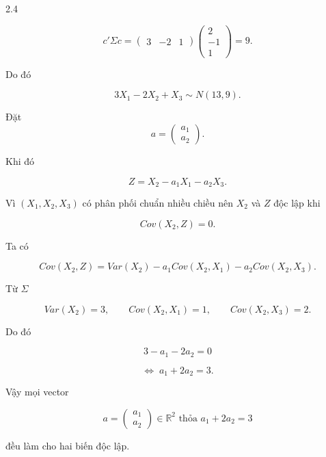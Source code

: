 \begin{question}{2.4}
\begin{subquestion}
\begin{answer}
\[
c'\Sigma c=
\begin{pmatrix}
3&-2&1
\end{pmatrix}
\begin{pmatrix}
2\\
-1\\
1
\end{pmatrix}
=9.
\]

Do đó

\[
3X_1-2X_2+X_3 \sim N(13,9).
\]

\end{answer}
\end{subquestion}

\begin{subquestion}
\begin{answer}

Đặt
\[
a=
\begin{pmatrix}
a_1\\
a_2
\end{pmatrix}.
\]

Khi đó

\[
Z=X_2-a_1X_1-a_2X_3.
\]

Vì $(X_1,X_2,X_3)$ có phân phối chuẩn nhiều chiều nên  
$X_2$ và $Z$ độc lập khi

\[
Cov(X_2,Z)=0.
\]

Ta có

\[
Cov(X_2,Z)
=Var(X_2)-a_1Cov(X_2,X_1)-a_2Cov(X_2,X_3).
\]

Từ $\Sigma$

\[
Var(X_2)=3,\qquad Cov(X_2,X_1)=1,\qquad Cov(X_2,X_3)=2.
\]

Do đó

\[
3-a_1-2a_2=0
\]

\[
\Leftrightarrow\; a_1+2a_2=3.
\]

Vậy mọi vector

\[
a=
\begin{pmatrix}
a_1\\
a_2
\end{pmatrix}
\in\mathbb{R}^2
\text{ thỏa } a_1+2a_2=3
\]

đều làm cho hai biến độc lập.

\end{answer}
\end{subquestion}

\end{question}